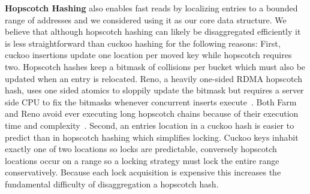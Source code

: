 \textbf{Hopscotch Hashing} also enables fast reads by
localizing entries to a bounded range of addresses and we
considered using it as our core data structure. We believe
that although hopscotch hashing can likely be disaggregated
efficiently it is less straightforward than cuckoo hashing
for the following reasons:
First, cuckoo insertions update one location per moved key while
hopscotch requires two. Hopscotch hashes keep a bitmask of
collisions per bucket which must also be updated when an
entry is relocated. Reno, a heavily one-sided RDMA hopscotch
hash, uses one sided atomics to sloppily update the bitmask
but requires a server side CPU to fix the bitmasks whenever
concurrent inserts execute~\cite{reno}. Both Farm and Reno
avoid ever executing long hopscotch chains because of their
execution time and complexity~\cite{farm,reno}.
Second, an entries location in a cuckoo hash is easier to
predict than in hopscotch hashing which simplifies locking.
Cuckoo keys inhabit exactly one of two locations so locks
are predictable, conversely hopscotch locations occur on a
range so a locking strategy must lock the entire range
conservatively. Because each lock acquisition is expensive
this increases the fundamental difficulty of disaggregation
a hopscotch hash.